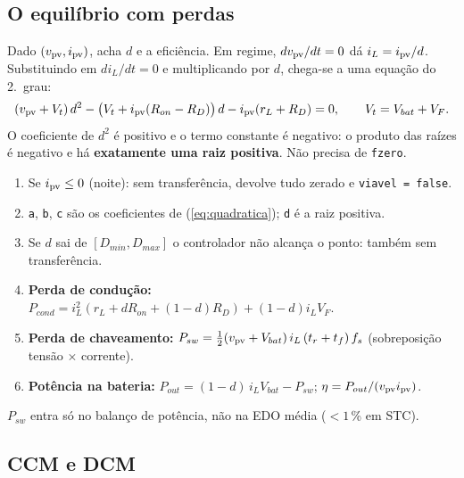 \subsection{O equil\'ibrio com perdas}

Dado $(v_{\mathrm{pv}},i_{\mathrm{pv}})$,  acha $d$ e a efici\^encia. Em regime, $dv_{\mathrm{pv}}/dt=0$ d\'a
$i_L=i_{\mathrm{pv}}/d$. Substituindo em $di_L/dt=0$ e multiplicando por $d$, chega-se a uma equa\c{c}\~ao do 2.\textordmasculine\ grau:
\begin{equation}\label{eq:quadratica}
(v_{\mathrm{pv}}+V_t)\,d^2-\big(V_t+i_{\mathrm{pv}}(R_{on}-R_D)\big)\,d-i_{\mathrm{pv}}(r_L+R_D)=0,\qquad V_t=V_{bat}+V_F .
\end{equation}
O coeficiente de $d^2$ \'e positivo e o termo constante \'e negativo: o produto das ra\'izes \'e negativo e h\'a
\textbf{exatamente uma raiz positiva}. N\~ao precisa de \texttt{fzero}.


\begin{logica}
\begin{enumerate}
\item Se $i_{\mathrm{pv}}\le0$ (noite): sem transfer\^encia, devolve tudo zerado e \texttt{viavel = false}.
\item \texttt{a}, \texttt{b}, \texttt{c} s\~ao os coeficientes de (\ref{eq:quadratica}); \texttt{d} \'e a raiz positiva.
\item Se $d$ sai de $[D_{min},D_{max}]$ o controlador n\~ao alcan\c{c}a o ponto: tamb\'em sem transfer\^encia.
\item \textbf{Perda de condu\c{c}\~ao:} $P_{cond}=i_L^2(r_L+dR_{on}+(1-d)R_D)+(1-d)i_LV_F$.
\item \textbf{Perda de chaveamento:} $P_{sw}=\tfrac12(v_{\mathrm{pv}}+V_{bat})\,i_L\,(t_r+t_f)\,f_s$ (sobreposi\c{c}\~ao tens\~ao $\times$ corrente).
\item \textbf{Pot\^encia na bateria:} $P_{out}=(1-d)\,i_LV_{bat}-P_{sw}$; $\eta=P_{out}/(v_{\mathrm{pv}}i_{\mathrm{pv}})$.
\end{enumerate}
$P_{sw}$ entra s\'o no balan\c{c}o de pot\^encia, n\~ao na EDO m\'edia ($<1$\,\% em STC).
\end{logica}

\subsection{CCM e DCM}


